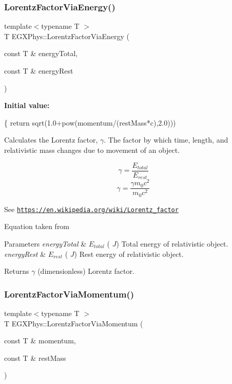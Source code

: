 \subsubsection{\texorpdfstring{Lorentz\+Factor\+Via\+Energy()}{LorentzFactorViaEnergy()}}
{\footnotesize\ttfamily template$<$typename T $>$ \\
T E\+G\+X\+Phys\+::\+Lorentz\+Factor\+Via\+Energy (\begin{DoxyParamCaption}\item[{const T \&}]{energy\+Total,  }\item[{const T \&}]{energy\+Rest }\end{DoxyParamCaption})}

{\bfseries Initial value\+:}
\begin{DoxyCode}
\{
        \textcolor{keywordflow}{return} sqrt(1.0+pow(momentum/(restMass*c),2.0)))
\end{DoxyCode}


Calculates the Lorentz factor, $\gamma$. The factor by which time, length, and relativistic mass changes due to movement of an object. 

\[\gamma=\frac{E_{total}}{E_{rest}}\] \[\gamma=\frac{\gamma m_0 c^2}{m_0 c^2}\]

See \href{https://en.wikipedia.org/wiki/Lorentz_factor}{\tt https\+://en.\+wikipedia.\+org/wiki/\+Lorentz\+\_\+factor}

Equation taken from


\begin{DoxyParams}{Parameters}
{\em energy\+Total} & $E_{total}$ ( $J$) Total energy of relativistic object. \\
\hline
{\em energy\+Rest} & $E_{rest}$ ( $J$) Rest energy of relativistic object. \\
\hline
\end{DoxyParams}
\begin{DoxyReturn}{Returns}
$\gamma$ (dimensionless) Lorentz factor. 
\end{DoxyReturn}
\mbox{\label{group___relativity_ga1ea24128654ac333dd843afdd5c003b7}} 
\subsubsection{\texorpdfstring{Lorentz\+Factor\+Via\+Momentum()}{LorentzFactorViaMomentum()}}
{\footnotesize\ttfamily template$<$typename T $>$ \\
T E\+G\+X\+Phys\+::\+Lorentz\+Factor\+Via\+Momentum (\begin{DoxyParamCaption}\item[{const T \&}]{momentum,  }\item[{const T \&}]{rest\+Mass }\end{DoxyParamCaption})}



